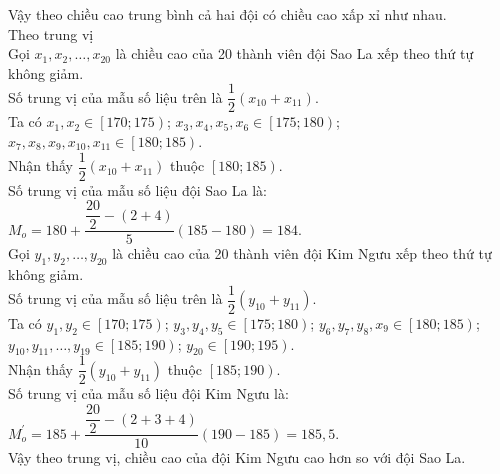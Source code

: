 \begin{ex}
{		 Vậy theo chiều cao trung bình cả hai đội có chiều cao xấp xỉ như nhau.\\
		 Theo trung vị\\
		Gọi $x_1, x_2, \ldots,  x_{20}$ là chiều cao của 20 thành viên đội Sao La xếp theo thứ tự không giảm.\\
		Số trung vị của mẫu  số liệu trên là $\dfrac{1}{2} \left(x_{10}+x_{11} \right)$.\\
		Ta có $x_1, x_2 \in \left[170; 175\right)$; $x_3, x_4, x_5, x_6 \in \left[175; 180\right)$; $x_7, x_8, x_9, x_{10}, x_{11} \in \left[180;  185\right)$.\\
		Nhận thấy $\dfrac{1}{2} \left(x_{10}+x_{11} \right)$  thuộc $\left[180; 185\right)$.\\
		Số trung vị của  mẫu số liệu đội Sao La là: $M_o=180+\dfrac{\dfrac{20}{2}-\left(2+4\right)}{5} \left(185-180\right)=184$.\\
		Gọi $y_1, y_2, \ldots, y_{20}$ là chiều cao của 20 thành viên  đội Kim Ngưu xếp theo thứ tự không giảm.\\
		Số trung vị của mẫu số liệu trên  là $\dfrac{1}{2} \left(y_{10}+y_{11} \right)$.\\
		Ta có $y_1, y_2 \in \left[170;  175\right)$; $y_3, y_4, y_5 \in \left[175; 180\right)$; $y_6, y_7, y_8, x_9 \in \left[180; 185\right)$;
		 $y_{10}, y_{11}, \ldots, y_{19} \in \left[185; 190\right)$;
		$y_{20} \in  \left[190; 195\right)$.\\
		Nhận thấy $\dfrac{1}{2} \left(y_{10}+y_{11} \right)$  thuộc $\left[185; 190\right)$.\\
		 Số trung vị của mẫu số liệu đội Kim Ngưu là: $M_o ^{{'}}=185+\dfrac{\dfrac{20}{2}-\left(2+3+4\right)}{10} \left(190-185\right)=185{,}5$.\\
		Vậy theo trung vị, chiều  cao của đội Kim Ngưu cao hơn so với đội Sao La.
	} 
\end{ex}

